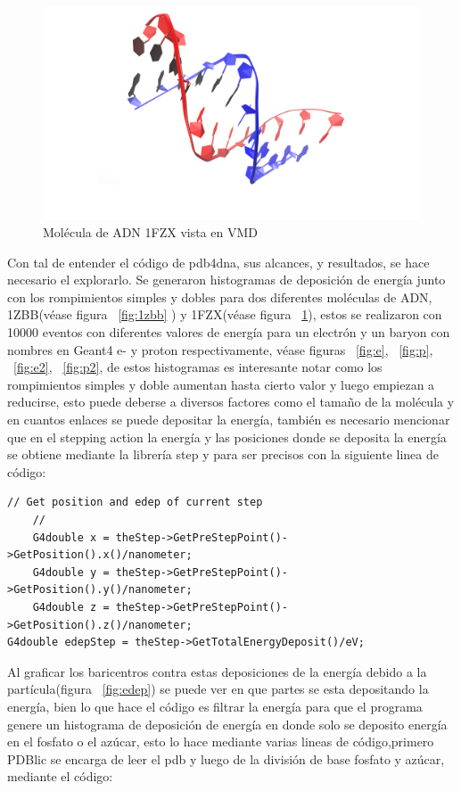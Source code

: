 \begin{figure}[htbp]
    \centering
    \includegraphics[width=0.8\linewidth]{./Figures/1FZX.png}
    \caption[Molécula de ADN 1FZX]{Molécula de ADN 1FZX vista en VMD}
    \label{fig:1fzx}
\end{figure}
Con tal de entender el código de pdb4dna, sus alcances, y resultados, se hace necesario el explorarlo. Se generaron histogramas de deposición de energía junto con los rompimientos simples y dobles para dos diferentes moléculas de ADN, 1ZBB(véase figura ~\ref{fig:1zbb} ) y 1FZX(véase figura ~\ref{fig:1fzx}), estos se realizaron con 10000 eventos con diferentes valores de energía para un electrón y un baryon con nombres en Geant4 e- y proton respectivamente, véase figuras ~\ref{fig:e}, ~\ref{fig:p}, ~\ref{fig:e2}, ~\ref{fig:p2}, de estos histogramas es interesante notar como los rompimientos simples y doble aumentan hasta cierto valor y luego empiezan a reducirse, esto puede deberse a diversos factores como el tamaño de la molécula y en cuantos enlaces se puede depositar la energía, también es necesario mencionar que en el stepping action la energía y las posiciones donde se deposita la energía se obtiene mediante la librería step y para ser precisos con la siguiente linea de código:
\lstset {language=C++}
\begin{lstlisting}
// Get position and edep of current step
    //
    G4double x = theStep->GetPreStepPoint()->GetPosition().x()/nanometer;
    G4double y = theStep->GetPreStepPoint()->GetPosition().y()/nanometer;
    G4double z = theStep->GetPreStepPoint()->GetPosition().z()/nanometer;
G4double edepStep = theStep->GetTotalEnergyDeposit()/eV;
\end{lstlisting}

Al graficar los baricentros contra estas deposiciones de la energía debido a la partícula(figura ~\ref{fig:edep}) se puede ver en que partes se esta depositando la energía, bien lo que hace el código es filtrar la energía para que el programa genere un histograma de deposición de energía en donde solo se deposito energía en el fosfato o el azúcar, esto lo hace mediante varias lineas de código,primero PDBlic se encarga de leer el pdb y luego de la división de base fosfato y azúcar, mediante el código:

